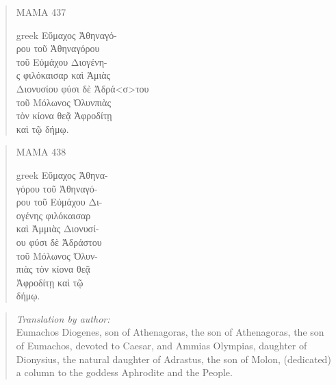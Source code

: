 \documentclass[amsthm,ebook]{saparticle}
\begin{document}
\begin{quotation}
\noindent MAMA 437\\
\begin{otherlanguage*}{greek}
\noindent Εὔμαχος Ἀθηναγό-\\
ρου τοῦ Ἀθηναγόρου\\
τοῦ Εὐμάχου Διογένη-\\
ς φιλόκαισαρ καὶ Ἀμιὰς\\
Διονυσίου φύσι δὲ Ἀδρά\textlatin{<}σ\textlatin{>}του\\
τοῦ Μόλωνος Ὀλυνπιὰς\\
τὸν κίονα θεᾷ Ἀφροδίτῃ\\
καὶ τῷ δήμῳ.
\end{otherlanguage*}
\end{quotation}

\begin{quotation}
\noindent MAMA 438 \\
\begin{otherlanguage*}{greek}
\noindent Εὔμαχος Ἀθηνα-\\
γόρου τοῦ Ἀθηναγό-\\
ρου τοῦ Εὐμάχου Δι-\\
ογένης φιλόκαισαρ\\
καὶ Ἀμμιὰς Διονυσί-\\
ου φύσι δὲ Ἀδράστου\\
τοῦ Μόλωνος Ὀλυν-\\
πιὰς τὸν κίονα θεᾷ\\
Ἀφροδίτῃ καὶ τῷ\\
δήμῳ.
\end{otherlanguage*}
\end{quotation}

\begin{quotation}
\emph{Translation by author:}\\
Eumachos Diogenes, son of Athenagoras, the son of Athenagoras, the son of Eumachos, devoted to Caesar, and Ammias Olympias, daughter of Dionysius, the natural daughter of Adrastus, the son of Molon, (dedicated) a column to the goddess Aphrodite and the People.  
\end{quotation}
\end{document}
